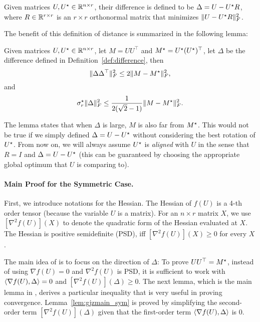 \begin{definition}\label{def:difference}
Given matrices $U, U^\star \in \mathbb{R}^{n\times r}$, their difference is defined to be $\Delta = U - U^\star R$, where $R\in \mathbb{R}^{r\times r}$ is an $r\times r$ orthonormal matrix that minimizes $\|U - U^\star R\|_F^2$.
\end{definition}

The benefit of this definition of distance is summarized in the following lemma:

\begin{lemma}
\label{lem:normconnect}
Given matrices $U, U^\star \in \mathbb{R}^{n\times r}$, let $M = UU^\top$ and $M^\star = U^\star(U^\star)^\top$, let $\Delta$ be the difference defined in Definition~\ref{def:difference}, then
\[
\|\Delta\Delta^\top\|_F^2 \le 2\|M - M^\star\|_F^2,
\]
and
\[
\sigma^\star_r\|\Delta\|_F^2 \le \frac{1}{2(\sqrt{2}-1)} \|M - M^\star\|_F^2.
\]
\end{lemma}

The lemma states that when $\Delta$ is large, $M$ is also far from $M^\star$. This would not be true if we simply defined $\Delta = U - U^\star$ without considering the best rotation of $U^\star$.
From now on, we will always assume $U^\star$ is {\em aligned} with $U$ in the sense that $R = I$ and $\Delta = U - U^\star$ (this can be guaranteed by choosing the appropriate global optimum that $U$ is comparing to). 

\paragraph{Main Proof for the Symmetric Case.}
First, we introduce notations for the Hessian. The Hessian of $f(U)$ is a 4-th order tensor (because the variable $U$ is a matrix). For an $n\times r$ matrix $X$, we use $[\nabla^2 f(U)](X)$ to denote the quadratic form of the Hessian evaluated at $X$. The Hessian is positive semidefinite (PSD), iff $[\nabla^2 f(U)](X) \ge 0$ for every $X$.

The main idea of \cite{GeJZ17} is to focus on the direction of $\Delta$:
To prove $UU^\top = M^\star$, instead of using $\nabla f(U) = 0$ and $\nabla^2 f(U)$ is PSD, it is sufficient to work with $\langle \nabla f(U), \Delta\rangle = 0$ and $[\nabla^2 f(U)](\Delta) \ge 0$.
The next lemma, which is the main lemma in \citep{GeJZ17}, derives a particular inequality that is very useful in proving convergence.
Lemma~\ref{lem:gjzmain_sym} is proved by simplifying the second-order term $[\nabla^2 f(U)](\Delta)$ given that the first-order term $\langle \nabla f(U), \Delta\rangle$ is 0.

